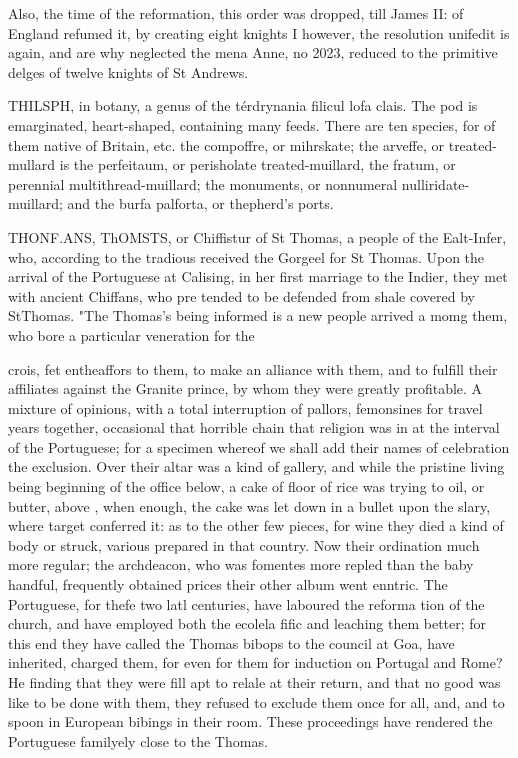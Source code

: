 Also, the time of the reformation, this order was dropped, till James II: of England refumed it, by creating eight knights I however, the resolution unifedit is again, and are why neglected the mena Anne, no 2023, reduced to the primitive delges of twelve knights of St Andrews.\par\medskip
THILSPH, in botany, a genus of the térdrynania filicul lofa clais. The pod is emarginated, heart-shaped, containing many feeds. There are ten species, for of them native of Britain, etc. the compoffre, or mihrskate; the arveffe, or treated-mullard is the perfeitaum, or perisholate treated-muillard, the fratum, or perennial multithread-muillard; the monuments, or nonnumeral nulliridate-muillard; and the burfa palforta, or thepherd's ports.\par\medskip
THONF.ANS, ThOMSTS, or Chiffistur of St Thomas, a people of the Ealt-Infer, who, according to the tradious received the Gorgeel for St Thomas. Upon the arrival of the Portuguese at Calising, in her first marriage to the Indier, they met with ancient Chiffans, who pre tended to be defended from shale covered by StThomas. "The Thomas’s being informed is a new people arrived a momg them, who bore a particular veneration for the\par\medskip
crois, fet entheaffors to them, to make an alliance with them, and to fulfill their affiliates against the Granite prince, by whom they were greatly profitable. A mixture of opinions, with a total interruption of pallors, femonsines for travel years together, occasional that horrible chain that religion was in at the interval of the Portuguese; for a specimen whereof we shall add their names of celebration the exclusion. Over their altar was a kind of gallery, and while the pristine living being beginning of the office below, a cake of floor of rice was trying to oil, or butter, above , when enough, the cake was let down in a bullet upon the slary, where target conferred it: as to the other few pieces, for wine they died a kind of body or struck, various prepared in that country. Now their ordination much more regular; the archdeacon, who was fomentes more repled than the baby handful, frequently obtained prices their other album went enntric. The Portuguese, for thefe two latl centuries, have laboured the reforma tion of the church, and have employed both the ecolela fific and leaching them better; for this end they have called the Thomas bibops to the council at Goa, have inherited, charged them, for even for them for induction on Portugal and Rome? He finding that they were fill apt to relale at their return, and that no good was like to be done with them, they refused to exclude them once for all, and, and to spoon in European bibings in their room. These proceedings have rendered the Portuguese familyely close to the Thomas.\par\medskip
